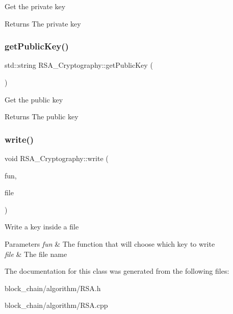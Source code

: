 Get the private key

\begin{DoxyReturn}{Returns}
The private key 
\end{DoxyReturn}
\mbox{\label{classRSA__Cryptography_a9692bde79db1e43da95511fe0d0c1a0b}} 
\subsubsection{\texorpdfstring{get\+Public\+Key()}{getPublicKey()}}
{\footnotesize\ttfamily std\+::string R\+S\+A\+\_\+\+Cryptography\+::get\+Public\+Key (\begin{DoxyParamCaption}{ }\end{DoxyParamCaption})}

Get the public key

\begin{DoxyReturn}{Returns}
The public key 
\end{DoxyReturn}
\mbox{\label{classRSA__Cryptography_a7772b886bb2f27b95df33019d04eee69}} 
\subsubsection{\texorpdfstring{write()}{write()}}
{\footnotesize\ttfamily void R\+S\+A\+\_\+\+Cryptography\+::write (\begin{DoxyParamCaption}\item[{void($\ast$)(B\+IO $\ast$, R\+SA $\ast$)}]{fun,  }\item[{std\+::string}]{file }\end{DoxyParamCaption})}

Write a key inside a file


\begin{DoxyParams}{Parameters}
{\em fun} & The function that will choose which key to write \\
\hline
{\em file} & The file name \\
\hline
\end{DoxyParams}


The documentation for this class was generated from the following files\+:\begin{DoxyCompactItemize}
\item 
block\+\_\+chain/algorithm/R\+S\+A.\+h\item 
block\+\_\+chain/algorithm/R\+S\+A.\+cpp\end{DoxyCompactItemize}
